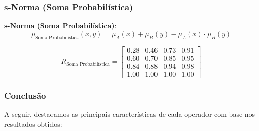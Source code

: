 \documentclass[a4paper,12pt]{article}
\begin{document}
\subsubsection{s-Norma (Soma Probabilística)}

\textbf{s-Norma (Soma Probabilística)}:
\[
\mu_{\text{Soma Probabilística}}(x, y) = \mu_A(x) + \mu_B(y) - \mu_A(x) \cdot \mu_B(y)
\]

\[
R_{\text{Soma Probabilística}} =
\begin{bmatrix}
0.28 & 0.46 & 0.73 & 0.91 \\
0.60 & 0.70 & 0.85 & 0.95 \\
0.84 & 0.88 & 0.94 & 0.98 \\
1.00 & 1.00 & 1.00 & 1.00
\end{bmatrix}
\]

\subsubsection{Conclusão}

A seguir, destacamos as principais características de cada operador com base nos resultados obtidos:
\end{document}
